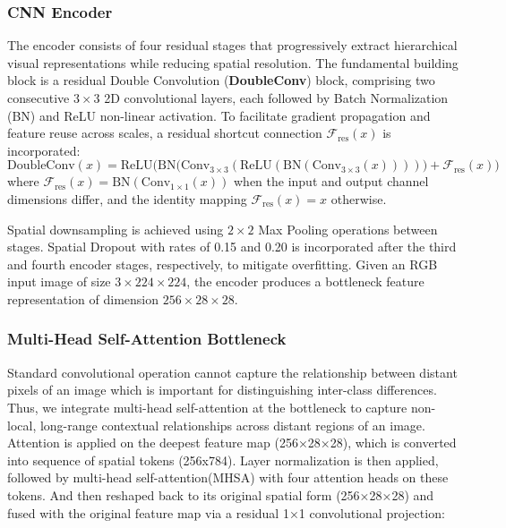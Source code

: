 \documentclass[pdflatex,sn-nature]{sn-jnl}%
\theoremstyle{thmstyleone}%
\theoremstyle{thmstyletwo}%
\theoremstyle{thmstylethree}%
\begin{document}
\subsubsection{CNN Encoder}
The encoder consists of four residual stages that progressively extract hierarchical visual representations while reducing spatial resolution. The fundamental building block is a residual Double Convolution (\textbf{DoubleConv}) block, comprising two consecutive $3 \times 3$ 2D convolutional layers, each followed by Batch Normalization (BN) and ReLU non-linear activation. To facilitate gradient propagation and feature reuse across scales, a residual shortcut connection $\mathcal{F}_{\text{res}}(x)$ is incorporated:
\begin{equation}
    \text{DoubleConv}(x) = \text{ReLU}\Big(\text{BN}\big(\text{Conv}_{3\times3}(\text{ReLU}(\text{BN}(\text{Conv}_{3\times3}(x))))\big) + \mathcal{F}_{\text{res}}(x)\Big)
\end{equation}
where $\mathcal{F}_{\text{res}}(x) = \text{BN}(\text{Conv}_{1\times1}(x))$ when the input and output channel dimensions differ, and the identity mapping $\mathcal{F}_{\text{res}}(x) = x$ otherwise.

Spatial downsampling is achieved using $2 \times 2$ Max Pooling operations between stages. Spatial Dropout with rates of 0.15 and 0.20 is incorporated after the third and fourth encoder stages, respectively, to mitigate overfitting. Given an RGB input image of size $3 \times 224 \times 224$, the encoder produces a bottleneck feature representation of dimension $256 \times 28 \times 28$.

\subsubsection{Multi-Head Self-Attention Bottleneck}
Standard convolutional operation cannot capture the relationship between distant pixels of an image which is important for distinguishing inter-class differences. Thus, we integrate multi-head self-attention at the bottleneck to capture non-local, long-range contextual relationships across distant regions of an image. Attention is applied on the deepest feature map (256×28×28), which is converted into sequence of spatial tokens (256x784). Layer normalization is then applied, followed by multi-head self-attention(MHSA) with four attention heads on these tokens. And then reshaped back to its original spatial form (256×28×28) and fused with the original feature map via a residual 1×1 convolutional projection:
\end{document}
